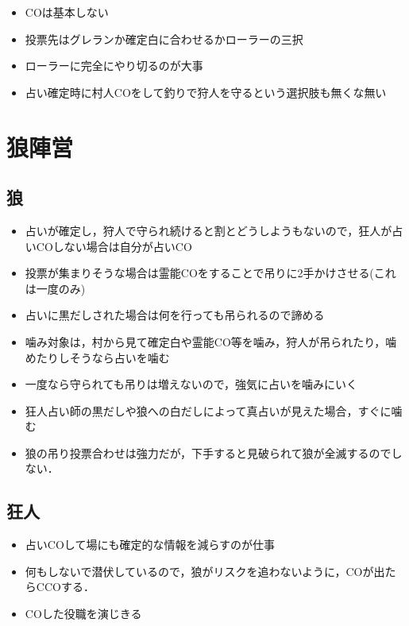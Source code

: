 \documentclass[a4paper]{jarticle}
\begin{document}
\begin{itemize}
    \item COは基本しない
    \item 投票先はグレランか確定白に合わせるかローラーの三択
    \item ローラーに完全にやり切るのが大事
    \item 占い確定時に村人COをして釣りで狩人を守るという選択肢も無くな無い
\end{itemize}

\section{狼陣営}

\subsection{狼}

\begin{itemize}
    \item 占いが確定し，狩人で守られ続けると割とどうしようもないので，狂人が占いCOしない場合は自分が占いCO
    \item 投票が集まりそうな場合は霊能COをすることで吊りに2手かけさせる(これは一度のみ)
    \item 占いに黒だしされた場合は何を行っても吊られるので諦める
    \item 噛み対象は，村から見て確定白や霊能CO等を噛み，狩人が吊られたり，噛めたりしそうなら占いを噛む
    \item 一度なら守られても吊りは増えないので，強気に占いを噛みにいく
    \item 狂人占い師の黒だしや狼への白だしによって真占いが見えた場合，すぐに噛む
    \item 狼の吊り投票合わせは強力だが，下手すると見破られて狼が全滅するのでしない．
\end{itemize}

\subsection{狂人}
\begin{itemize}
    \item 占いCOして場にも確定的な情報を減らすのが仕事
    \item 何もしないで潜伏しているので，狼がリスクを追わないように，COが出たらCCOする．
    \item COした役職を演じきる
\end{itemize}
\end{document}
